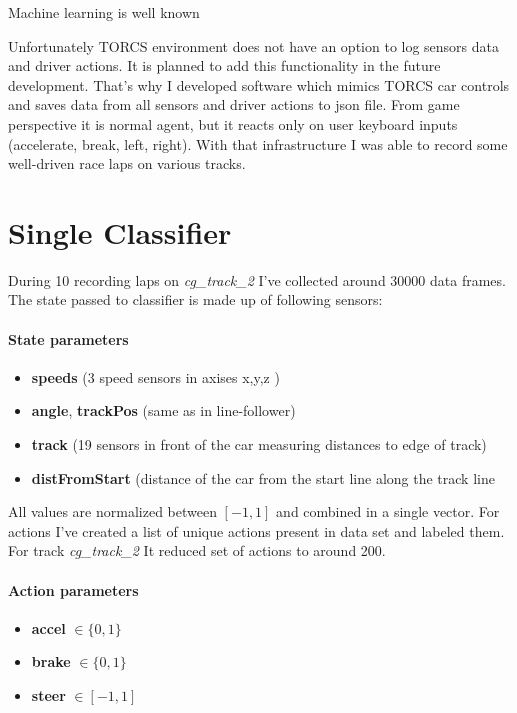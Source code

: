 \documentclass[declaration,shortabstract,english,inz]{iithesis}
\begin{document}
Machine learning is well known 

Unfortunately TORCS environment does not have an option to log sensors data and driver actions. It is planned to add this functionality in the future development. That's why I developed software which mimics TORCS car controls and saves data from all sensors and driver actions to json file. From game perspective it is normal agent, but it reacts only on user keyboard inputs (accelerate, break, left, right).  With that infrastructure I was able to record some well-driven race laps on various tracks.  

\section{Single Classifier}

During 10 recording laps on \textit{cg\_track\_2} I've collected around 30000 data frames. The state passed to classifier is made up of following sensors:

\paragraph{State parameters}
\begin{itemize}
    \item \textbf{speeds} (3 speed sensors in axises x,y,z )
    \item \textbf{angle}, \textbf{trackPos} (same as in line-follower) 
    \item \textbf{track}  (19 sensors in front of the car measuring distances to edge of track) 
    \item \textbf{distFromStart} (distance of the car from the start line along the track line
\end{itemize}

All values are normalized between $[-1,1]$ and combined in a single vector. For actions I've created a list of unique actions present in data set and labeled them. For track \textit{cg\_track\_2} It reduced set of actions to around 200. 

\paragraph{Action parameters}
\begin{itemize}
    \item \textbf{accel} $\in \{0,1\}$
    \item \textbf{brake} $\in \{0,1\}$ 
    \item \textbf{steer} $\in [-1,1]$
\end{itemize}
\end{document}
